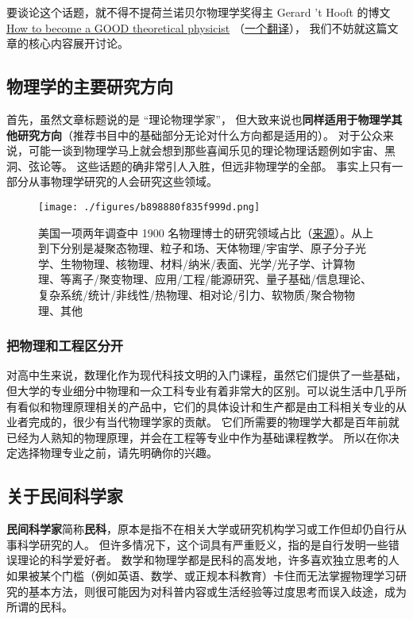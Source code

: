 
要谈论这个话题，就不得不提荷兰诺贝尔物理学奖得主 Gerard 't Hooft 的博文 \href{https://webspace.science.uu.nl/~hooft101/theorist.html}{How to become a GOOD theoretical physicist} （\href{https://xialab.pku.edu.cn/kytdyw1/zdylm.m.jsp?wbtreeid=1011&tstreeid=11956&_t_uid=2945&language=en&homepageuuid=BF649325C5584FC683CE0B601D21AC65&templateuuid=4CC182410BA14FF8B55ED726FB2087FB&producttype=0&_tmode_=99&tsitesapptype=zdylm}{一个翻译}）， 我们不妨就这篇文章的核心内容展开讨论。

\subsection{物理学的主要研究方向}
首先，虽然文章标题说的是 “理论物理学家”， 但大致来说也\textbf{同样适用于物理学其他研究方向}（推荐书目中的基础部分无论对什么方向都是适用的）。 对于公众来说，可能一谈到物理学马上就会想到那些喜闻乐见的理论物理话题例如宇宙、黑洞、弦论等。 这些话题的确非常引人入胜，但远非物理学的全部。 事实上只有一部分从事物理学研究的人会研究这些领域。

\begin{figure}[ht]
\centering
\texttt{[image: ./figures/b898880f835f999d.png]}
\caption{美国一项两年调查中 1900 名物理博士的研究领域占比（\href{https://ww2.aip.org/statistics/trends-in-physics-phds}{来源}）。从上到下分别是凝聚态物理、粒子和场、天体物理/宇宙学、原子分子光学、生物物理、核物理、材料/纳米/表面、光学/光子学、计算物理、等离子/聚变物理、应用/工程/能源研究、量子基础/信息理论、复杂系统/统计/非线性/热物理、相对论/引力、软物质/聚合物物理、其他} \label{fig_SdyPhy_1}
\end{figure}

\subsubsection{把物理和工程区分开}
对高中生来说，数理化作为现代科技文明的入门课程，虽然它们提供了一些基础，但大学的专业细分中物理和一众工科专业有着非常大的区别。可以说生活中几乎所有看似和物理原理相关的产品中，它们的具体设计和生产都是由工科相关专业的从业者完成的，很少有当代物理学家的贡献。 它们所需要的物理学大都是百年前就已经为人熟知的物理原理，并会在工程等专业中作为基础课程教学。 所以在你决定选择物理专业之前，请先明确你的兴趣。

\subsection{关于民间科学家}
\textbf{民间科学家}简称\textbf{民科}，原本是指不在相关大学或研究机构学习或工作但却仍自行从事科学研究的人。 但许多情况下，这个词具有严重贬义，指的是自行发明一些错误理论的科学爱好者。 数学和物理学都是民科的高发地，许多喜欢独立思考的人如果被某个门槛（例如英语、数学、或正规本科教育）卡住而无法掌握物理学习研究的基本方法，则很可能因为对科普内容或生活经验等过度思考而误入歧途，成为所谓的民科。

